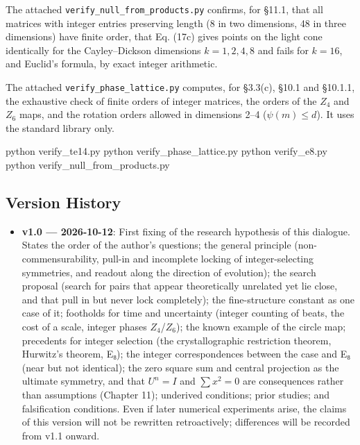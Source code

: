 \documentclass[
  a4paper,
]{article}
\newenvironment{Shaded}{}{}
\newcommand{\ExtensionTok}[1]{#1}
\newcommand{\NormalTok}[1]{#1}
\providecommand{\tightlist}{%
  \setlength{\itemsep}{0pt}\setlength{\parskip}{0pt}}
\begin{document}
The attached \texttt{verify\_\allowbreak{}null\_\allowbreak{}from\_\allowbreak{}products.py} confirms, for
§11.1, that all matrices with integer entries preserving length (8 in
two dimensions, 48 in three dimensions) have finite order, that Eq.
(17c) gives points on the light cone identically for the Cayley--Dickson
dimensions \(k=1,2,4,8\) and fails for \(k=16\), and Euclid's formula,
by exact integer arithmetic.

The attached \texttt{verify\_\allowbreak{}phase\_\allowbreak{}lattice.py} computes, for §3.3(c),
§10.1 and §10.1.1, the exhaustive check of finite orders of integer
matrices, the orders of the \(Z_4\) and \(Z_6\) maps, and the rotation
orders allowed in dimensions 2--4 (\(\psi(m)\le d\)). It uses the
standard library only.

\begin{Shaded}
\begin{Highlighting}[]
\ExtensionTok{python}\NormalTok{ verify\_te14.py}
\ExtensionTok{python}\NormalTok{ verify\_phase\_lattice.py}
\ExtensionTok{python}\NormalTok{ verify\_e8.py}
\ExtensionTok{python}\NormalTok{ verify\_null\_from\_products.py}
\end{Highlighting}
\end{Shaded}

\subsection{Version History}\label{version-history}

\begin{itemize}
\tightlist
\item
  \textbf{v1.0 --- 2026-10-12}: First fixing of the research hypothesis
  of this dialogue. States the order of the author's questions; the
  general principle (non-commensurability, pull-in and incomplete
  locking of integer-selecting symmetries, and readout along the
  direction of evolution); the search proposal (search for pairs that
  appear theoretically unrelated yet lie close, and that pull in but
  never lock completely); the fine-structure constant as one case of it;
  footholds for time and uncertainty (integer counting of beats, the
  cost of a scale, integer phases \(Z_4\)/\(Z_6\)); the known example of
  the circle map; precedents for integer selection (the crystallographic
  restriction theorem, Hurwitz's theorem, E₈); the integer
  correspondences between the case and E₈ (near but not identical); the
  zero square sum and central projection as the ultimate symmetry, and
  that \(U^n=I\) and \(\sum x^2=0\) are consequences rather than
  assumptions (Chapter 11); underived conditions; prior studies; and
  falsification conditions. Even if later numerical experiments arise,
  the claims of this version will not be rewritten retroactively;
  differences will be recorded from v1.1 onward.
\end{itemize}
\end{document}
